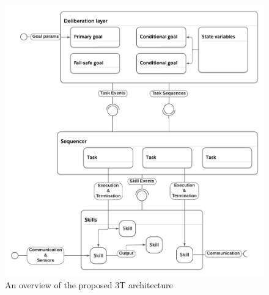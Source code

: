 \documentclass[0main.tex]{subfiles}
\begin{document}
\begin{figure}[htbp]
    \centering
    \includegraphics[width=\textwidth]{architecture-proposal.png}
    \caption{An overview of the proposed 3T architecture}
    \label{arch-proposal}
\end{figure}

\end{document}
